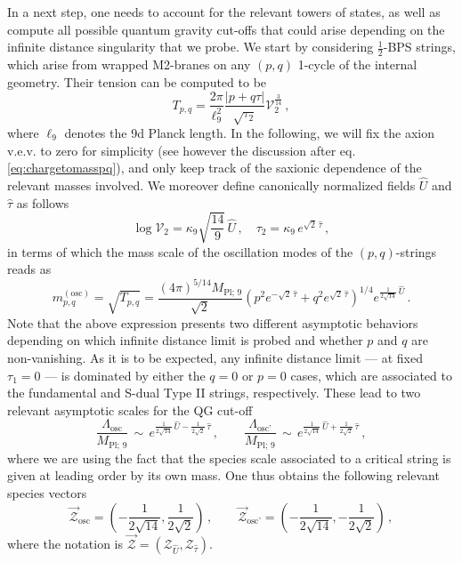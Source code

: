 In a next step, one needs to account for the relevant towers of states, as well as compute all possible quantum gravity cut-offs that could arise depending on the infinite distance singularity that we probe. We start by considering $\frac{1}{2}$-BPS strings, which arise from wrapped M2-branes on any $(p,q)$ 1-cycle of the internal geometry. Their tension can be computed to be
%
\begin{equation}\label{eq:pqstrings9d}
	T_{p,q} = \frac{2\pi}{\ell_{9}^2} \frac{|p+q\tau|}{\sqrt{\tau_2}} \mathcal{V}_2^{\frac{3}{14}}\, ,
\end{equation}
%
where $\ell_{9}$ denotes the 9d Planck length. In the following, we will fix the axion v.e.v. to zero for simplicity (see however the discussion after eq. \eqref{eq:chargetomasspq}), and only keep track of the saxionic dependence of the relevant masses involved. We moreover define canonically normalized fields $\hat U$ and $\hat \tau$ as follows
%
\begin{equation} \label{eq:canonicalnormalization}
  \log \mathcal{V}_2 =  \kappa_9 \sqrt{\frac{14}{9}}\, \hat U \, , \quad \tau_2 = \kappa_9\, e^{\sqrt{2} \, \hat\tau} \, ,
\end{equation}
%
in terms of which the mass scale of the oscillation modes of the $(p,q)$-strings reads as
%
\begin{equation} \label{strings}
  m^{(\text{osc})}_{p,q} = \sqrt{T_{p,q}} =  \frac{(4\pi)^{5/14} M_{\text{Pl};\, 9}}{\sqrt{2}} \left( p^2 e^{-\sqrt{2} \,\hat\tau} + q^2 e^{\sqrt{2} \,\hat\tau}\right)^{1/4} e^{\frac{1}{2 \sqrt{14}} \, \hat U} \, .
\end{equation}
%
Note that the above expression presents two different asymptotic behaviors depending on which infinite distance limit is probed and whether $p$ and $q$ are non-vanishing. As it is to be expected, any infinite distance limit --- at fixed $\tau_1=0$ --- is dominated by either the $q=0$ or $p=0$ cases, which are associated to the fundamental and S-dual Type II strings, respectively. These lead to two relevant asymptotic scales for the QG cut-off
%
\begin{equation} \label{string-species}
  \frac{\Lambda_{\text{osc}}}{M_{\text{Pl};\, 9}}\, \sim\, e^{\frac{1}{2 \sqrt{14}} \, \hat U-\frac{1}{2\sqrt{2}} \,\hat\tau } \, , \qquad \frac{\Lambda_{\text{osc'}}}{M_{\text{Pl};\, 9}}\, \sim\, e^{\frac{1}{2 \sqrt{14}} \, \hat U + \frac{1}{2\sqrt{2}} \,\hat\tau } \, ,
\end{equation}
%
where we are using the fact that the species scale associated to a critical string is given at leading order by its own mass. One thus obtains the following relevant species vectors
%
\begin{equation}
\label{eq:speciesscalevectorsstringsT2}
  \vec{\mathcal{Z}}_{\text{osc}} = \left( -\frac{1}{2 \sqrt{14}},\frac{1}{2\sqrt{2}} \right) \, , \qquad 
  \vec{\mathcal{Z}}_{\text{osc'}} = \left( -\frac{1}{2 \sqrt{14}},- \frac{1}{2\sqrt{2}} \right) \, ,
\end{equation}
%
where the notation is $\vec{\mathcal{Z}} = \left(\mathcal{Z}_{\hat U}, \mathcal{Z}_{\hat \tau} \right)$.

